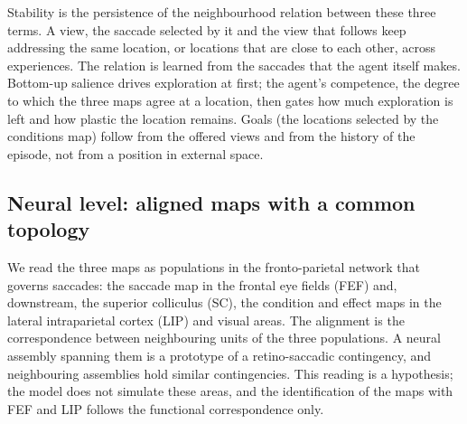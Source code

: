 \documentclass[14pt]{article}
\begin{document}
Stability is the persistence of the neighbourhood relation between these three terms.
A view, the saccade selected by it and the view that follows keep addressing the same location, or locations that are close to each other, across experiences.
The relation is learned from the saccades that the agent itself makes.
Bottom-up salience drives exploration at first; the agent's competence, the degree to which the three maps agree at a location, then gates how much exploration is left and how plastic the location remains.
Goals (the locations selected by the conditions map) follow from the offered views and from the history of the episode, not from a position in external space.

\subsection{Neural level: aligned maps with a common topology}

We read the three maps as populations in the fronto-parietal network that governs saccades: the saccade map in the frontal eye fields (FEF) and, downstream, the superior colliculus (SC), the condition and effect maps in the lateral intraparietal cortex (LIP) and visual areas.
The alignment is the correspondence between neighbouring units of the three populations.
A neural assembly spanning them is a prototype of a retino-saccadic contingency, and neighbouring assemblies hold similar contingencies.
This reading is a hypothesis; the model does not simulate these areas, and the identification of the maps with FEF and LIP follows the functional correspondence only.
\end{document}

